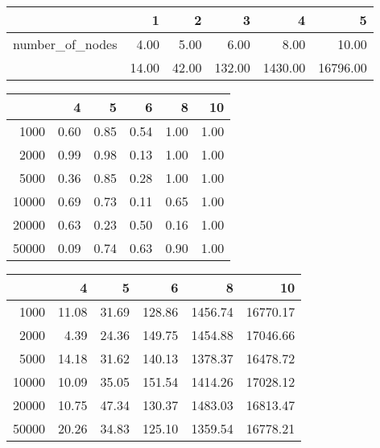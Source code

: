 \begin{table}[ht]
\begin{center}
\begin{tabular}{rrrrrr}
  \hline
 & 1 & 2 & 3 & 4 & 5 \\ 
  \hline
number\_of\_nodes & 4.00 & 5.00 & 6.00 & 8.00 & 10.00 \\ 
   & 14.00 & 42.00 & 132.00 & 1430.00 & 16796.00 \\ 
   \hline
\end{tabular}
\end{center}
\end{table}
\begin{table}[ht]
\begin{center}
\begin{tabular}{rrrrrr}
  \hline
 & 4 & 5 & 6 & 8 & 10 \\ 
  \hline
1000 & 0.60 & 0.85 & 0.54 & 1.00 & 1.00 \\ 
  2000 & 0.99 & 0.98 & 0.13 & 1.00 & 1.00 \\ 
  5000 & 0.36 & 0.85 & 0.28 & 1.00 & 1.00 \\ 
  10000 & 0.69 & 0.73 & 0.11 & 0.65 & 1.00 \\ 
  20000 & 0.63 & 0.23 & 0.50 & 0.16 & 1.00 \\ 
  50000 & 0.09 & 0.74 & 0.63 & 0.90 & 1.00 \\ 
   \hline
\end{tabular}
\end{center}
\end{table}
\begin{table}[ht]
\begin{center}
\begin{tabular}{rrrrrr}
  \hline
 & 4 & 5 & 6 & 8 & 10 \\ 
  \hline
1000 & 11.08 & 31.69 & 128.86 & 1456.74 & 16770.17 \\ 
  2000 & 4.39 & 24.36 & 149.75 & 1454.88 & 17046.66 \\ 
  5000 & 14.18 & 31.62 & 140.13 & 1378.37 & 16478.72 \\ 
  10000 & 10.09 & 35.05 & 151.54 & 1414.26 & 17028.12 \\ 
  20000 & 10.75 & 47.34 & 130.37 & 1483.03 & 16813.47 \\ 
  50000 & 20.26 & 34.83 & 125.10 & 1359.54 & 16778.21 \\ 
   \hline
\end{tabular}
\end{center}
\end{table}
